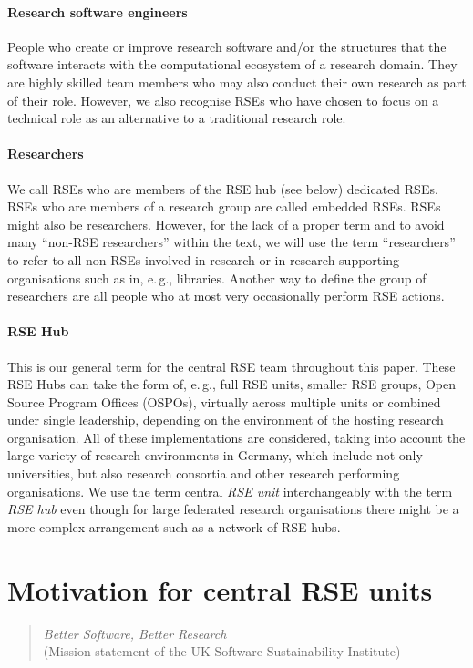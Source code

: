 \documentclass[10pt,letterpaper]{article}
\newcommand*{\eg}{e.\,g.,\xspace}
\begin{document}
\paragraph{Research software engineers}
People who create or improve research software and/or the structures that the software interacts with the computational ecosystem of a research domain.
They are highly skilled team members who may also conduct their own research as part of their role.
However, we also recognise RSEs who have chosen to focus on a technical role as an alternative to a traditional research role.
\paragraph{Researchers}
We call RSEs who are members of the RSE hub (see below) dedicated RSEs.
RSEs who are members of a research group are called embedded RSEs.
RSEs might also be researchers.
However, for the lack of a proper term and to avoid many “non-RSE researchers” within the text, we will use the term “researchers” to refer to all non-RSEs involved in research or in research supporting organisations such as in, \eg{} libraries.
Another way to define the group of researchers are all people who at most very occasionally perform RSE actions.
\paragraph{RSE Hub}
This is our general term for the central RSE team throughout this paper.
These RSE Hubs can take the form of, \eg{} full RSE units, smaller RSE groups, Open Source Program Offices (OSPOs), virtually across multiple units or combined under single leadership, depending on the environment of the hosting research organisation.
All of these implementations are considered, taking into account the large variety of research environments in Germany, which include not only universities, but also research consortia and other research performing organisations.
We use the term central \emph{RSE unit} interchangeably with the term \emph{RSE hub} even though for large federated research organisations there might be a more complex arrangement such as a network of RSE hubs.

\section*{Motivation for central RSE units}
\label{sec:motivation}
\begin{quotation}
      \noindent \textit{Better Software, Better Research}\\(Mission statement of the UK Software Sustainability Institute)
\end{quotation}
\end{document}
